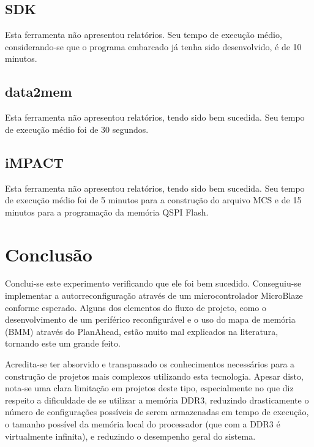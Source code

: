 \documentclass[11pt,a4paper,oneside]{book}
\begin{document}
\subsection{SDK}
Esta ferramenta não apresentou relatórios.
Seu tempo de execução médio, considerando-se que o programa embarcado já tenha sido desenvolvido, é de 10 minutos.

\subsection{data2mem}
Esta ferramenta não apresentou relatórios, tendo sido bem sucedida.
Seu tempo de execução médio foi de 30 segundos.

\subsection{iMPACT}
Esta ferramenta não apresentou relatórios, tendo sido bem sucedida.
Seu tempo de execução médio foi de 5 minutos para a construção do arquivo MCS e de 15 minutos para a programação da memória QSPI Flash.

\section{Conclusão}
Conclui-se este experimento verificando que ele foi bem sucedido.
Conseguiu-se implementar a autorreconfiguração através de um microcontrolador MicroBlaze conforme esperado.
Alguns dos elementos do fluxo de projeto, como o desenvolvimento de um periférico reconfigurável e o uso do mapa de memória (BMM) através do PlanAhead, estão muito mal explicados na literatura, tornando este um grande feito.

Acredita-se ter absorvido e transpassado os conhecimentos necessários para a construção de projetos mais complexos utilizando esta tecnologia.
Apesar disto, nota-se uma clara limitação em projetos deste tipo, especialmente no que diz respeito a dificuldade de se utilizar a memória DDR3, reduzindo drasticamente o número de configurações possíveis de serem armazenadas em tempo de execução, o tamanho possível da memória local do processador (que com a DDR3 é virtualmente infinita), e reduzindo o desempenho geral do sistema.

\ifx\compilewholereport\undefined
	
	\newsavebox\mytempbib\savebox\mytempbib{\parbox{\textwidth}{}}

	\listoftodos
	
\end{document}

